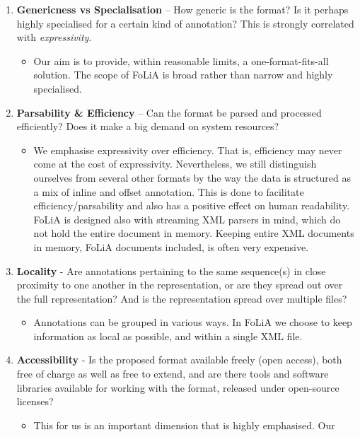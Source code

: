 \documentclass[a4paper,10pt,twoside]{article}
\begin{document}
\begin{enumerate}
\setcounter{enumi}{\theenumTemp}
\item \textbf{Genericness vs Specialisation} -- How generic is the format? Is
  it perhaps highly specialised for a certain kind of annotation? This is
  strongly correlated with
  \emph{expressivity}.
  \begin{itemize}
    \item[] Our aim is to provide, within reasonable limits, a
      one-format-fits-all solution. The scope of FoLiA is broad rather than
      narrow and highly specialised.
   \end{itemize}
\item \textbf{Parsability \& Efficiency} -- Can the format be parsed and
  processed efficiently? Does it make a big demand on system resources?
  \begin{itemize}
    \item[] We emphasise expressivity over efficiency. That is, efficiency may
      never come at the cost of expressivity. Nevertheless, we still
      distinguish ourselves from several other formats by the way the data is
      structured as a mix of inline and offset annotation. This is done to
      facilitate efficiency/parsability and also has a positive effect on human
      readability. FoLiA is designed also with streaming XML parsers in mind,
      which do not hold the entire document in memory. Keeping entire XML
      documents in memory, FoLiA documents included, is often very expensive.
  \end{itemize}
\item \textbf{Locality} - Are annotations pertaining to the same sequence(s) in
  close proximity to one another in the representation, or are they spread out
  over the full representation? And is the representation spread over multiple
  files?
  \begin{itemize}
    \item[] Annotations can be grouped in various ways. In FoLiA we choose to
      keep information as local as possible, and within a single XML file.
  \end{itemize}
\item \textbf{Accessibility} - Is the proposed format available freely (open
  access), both free of charge as well as free to extend, and are there tools and
  software libraries available for working with the format, released under
  open-source licenses? 
  \begin{itemize}
    \item[] This for us is an important dimension that is highly emphasised. Our

\end{itemize}
\end{enumerate}
\end{document}
